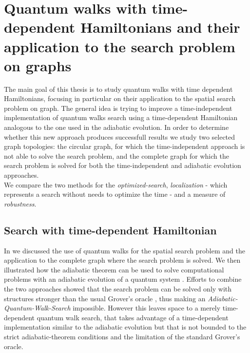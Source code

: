 \newpage
\thispagestyle{empty}
\singlespacing
\chapter{Quantum walks with time-dependent Hamiltonians and their application to the search problem on graphs}
\onehalfspacing
The main goal of this thesis is to study quantum walks with time dependent Hamiltonians, focusing in particular on their application to the spatial search problem on graph. The general idea is trying to improve a time-independent implementation of quantum walks search using a time-dependent Hamiltonian analogous to the one used in the adiabatic evolution. In order to determine whether this new approach produces successfull results we study two selected graph topologies: the circular graph, for which the time-independent approach is not able to solve the search problem, and the complete graph for which the search problem is solved for both the time-independent and adiabatic evolution approaches. \\ We compare the two methods for the \textit{optimized-search}, \textit{localization} - which represents a search without needs to optimize the time - and a measure of \textit{robustness}.

\section{Search with time-dependent Hamiltonian}
In  we discussed the use of quantum walks for the spatial search problem \cite{Childs2004} and the application to the complete graph where the search problem is solved. We then illustrated how the adiabatic theorem can be used to solve computational problems with an adiabatic evolution of a quantum system \cite{Farhi2000}. Efforts to combine the two approaches showed that the search problem can be solved only with structures stronger than the usual Grover's oracle \cite{Wong2016}, thus making an \textit{Adiabatic-Quantum-Walk-Search} impossible. However this leaves space to a merely time-dependent quantum walk search, that takes advantage of a time-dependent implementation similar to the adiabatic evolution but that is not bounded to the strict adiabatic-theorem conditions and the limitation of the standard Grover's oracle.


